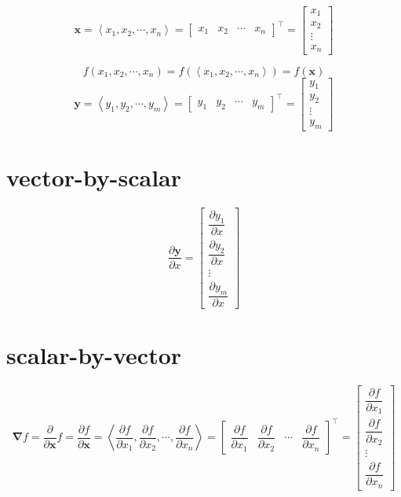 \documentclass[
]{book}
\theoremstyle{definition}
\theoremstyle{definition}
\theoremstyle{definition}
\theoremstyle{definition}
\theoremstyle{remark}
\begin{document}
\[
\boldsymbol{x}=\left\langle x_{1},x_{2},\cdots,x_{n}\right\rangle =\begin{bmatrix}x_{1} & x_{2} & \cdots & x_{n}\end{bmatrix}^{\intercal}=\begin{bmatrix}x_{1}\\
x_{2}\\
\vdots\\
x_{n}
\end{bmatrix}
\]

\[
f\left(x_{1},x_{2},\cdots,x_{n}\right)=f\left(\left\langle x_{1},x_{2},\cdots,x_{n}\right\rangle \right)=f\left(\boldsymbol{x}\right)
\]
\[
\boldsymbol{y}=\left\langle y_{1},y_{2},\cdots,y_{m}\right\rangle =\begin{bmatrix}y_{1} & y_{2} & \cdots & y_{m}\end{bmatrix}^{\intercal}=\begin{bmatrix}y_{1}\\
y_{2}\\
\vdots\\
y_{m}
\end{bmatrix}
\]

\section{vector-by-scalar}\label{vector-by-scalar}

\[
\dfrac{\partial\boldsymbol{y}}{\partial x}=\left[\begin{array}{c}
\dfrac{\partial y_{1}}{\partial x}\\
\dfrac{\partial y_{2}}{\partial x}\\
\vdots\\
\dfrac{\partial y_{m}}{\partial x}
\end{array}\right]
\]

\section{scalar-by-vector}\label{scalar-by-vector}

\[
\boldsymbol{\nabla}f=\dfrac{\partial}{\partial\boldsymbol{x}}f=\dfrac{\partial f}{\partial\boldsymbol{x}}=\left\langle \dfrac{\partial f}{\partial x_{1}},\dfrac{\partial f}{\partial x_{2}},\cdots,\dfrac{\partial f}{\partial x_{n}}\right\rangle =\begin{bmatrix}\dfrac{\partial f}{\partial x_{1}} & \dfrac{\partial f}{\partial x_{2}} & \cdots & \dfrac{\partial f}{\partial x_{n}}\end{bmatrix}^{\intercal}=\begin{bmatrix}\dfrac{\partial f}{\partial x_{1}}\\
\dfrac{\partial f}{\partial x_{2}}\\
\vdots\\
\dfrac{\partial f}{\partial x_{n}}
\end{bmatrix}
\]
\end{document}
